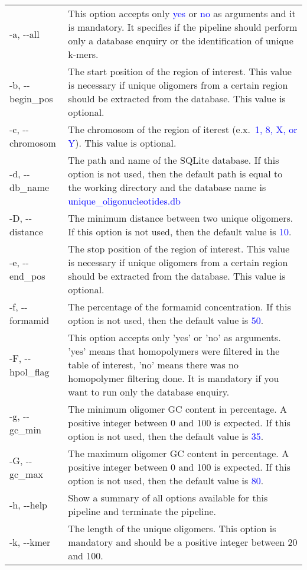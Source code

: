 \documentclass[a4paper,10pt]{report}
\begin{document}
\begin{longtable}{p{}p{}}
  -a, -{}-all & This option accepts only \textcolor{blue}{yes} or \textcolor{blue}{no} as arguments and it is mandatory. It specifies if the pipeline should perform only a database enquiry or the identification of unique k-mers.\\
  -b, -{}-begin\_pos & The start position of the region of interest. This value is necessary if unique oligomers from a certain region should be extracted from the database. This value is optional.\\
  -c, -{}-chromosom & The chromosom of the region of iterest (e.{}x.~\textcolor{blue}{1, 8, X, or Y}). This value is optional.\\
  -d, -{}-db\_name & The path and name of the SQLite database. If this option is not used, then the default path is equal to the working directory and the database name is \textcolor{blue}{unique\_oligonucleotides.db}\\
  -D, -{}-distance & The minimum distance between two unique oligomers. If this option is not used, then the default value is \textcolor{blue}{10}.\\
  -e, -{}-end\_pos & The stop position of the region of interest. This value is necessary if unique oligomers from a certain region should be extracted from the database. This value is optional.\\
  -f, -{}-formamid & The percentage of the formamid concentration. If this option is not used, then the default value is \textcolor{blue}{50}.\\
  -F, -{}-hpol\_flag & This option accepts only 'yes' or 'no' as arguments. 'yes' means that homopolymers were filtered in the table of interest, 'no' means there was no homopolymer filtering done. It is mandatory if you want to run only the database enquiry.\\
  -g, -{}-gc\_min & The minimum oligomer GC content in percentage. A positive integer between 0 and 100 is expected. If this option is not used, then the default value is \textcolor{blue}{35}.\\
  -G, -{}-gc\_max & The maximum oligomer GC content in percentage. A positive integer between 0 and 100 is expected. If this option is not used, then the default value is \textcolor{blue}{80}.\\
  -h, -{}-help & Show a summary of all options available for this pipeline and terminate the pipeline.\\
  -k, -{}-kmer & The length of the unique oligomers. This option is mandatory and should be a positive integer between 20 and 100.\\

\end{longtable}
\end{document}
